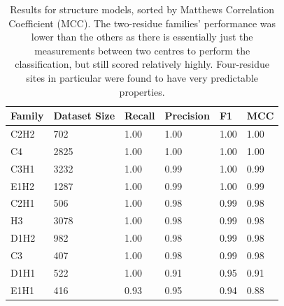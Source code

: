 \begin{table}
  \caption[Structural model performance.]{\label{tab:structure}Results for structure models, sorted
    by Matthews Correlation Coefficient (MCC). The two-residue
    families' performance was lower than the others as there is
    essentially just the measurements between two centres to perform
    the classification, but still scored relatively
    highly. Four-residue sites in particular were found to have very
    predictable properties.}
\begin{center}
\begin{tabular}{llllll} \hline
Family & Dataset Size & Recall & Precision & F1    & MCC  \\ \hline
C2H2   &  702         & 1.00   & 1.00      & 1.00  & 1.00 \\
C4     & 2825         & 1.00   & 1.00      & 1.00  & 1.00 \\
C3H1   & 3232         & 1.00   & 0.99      & 1.00  & 0.99 \\
E1H2   & 1287         & 1.00   & 0.99      & 1.00  & 0.99 \\
C2H1   &  506         & 1.00   & 0.98      & 0.99  & 0.98 \\
H3     & 3078         & 1.00   & 0.98      & 0.99  & 0.98 \\
D1H2   &  982         & 1.00   & 0.98      & 0.99  & 0.98 \\
C3     &  407         & 1.00   & 0.98      & 0.99  & 0.98 \\
D1H1   &  522         & 1.00   & 0.91      & 0.95  & 0.91 \\ 
E1H1   &  416         & 0.93   & 0.95      & 0.94  & 0.88 \\ \hline
\end{tabular}
\end{center}
\end{table}

